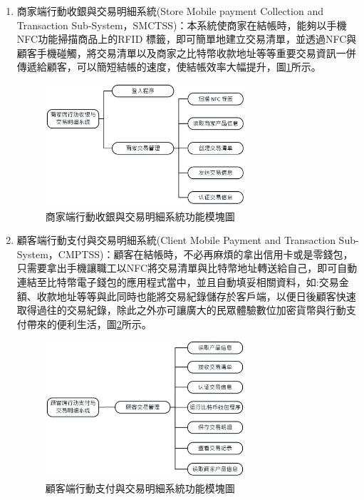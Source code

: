 \begin{enumerate}
		\item 商家端行動收銀與交易明細系統(Store Mobile payment Collection and Transaction Sub-System，SMCTSS)：本系統使商家在結帳時，能夠以手機NFC功能掃描商品上的RFID 標籤，即可簡單地建立交易清單，並透過NFC與顧客手機碰觸，將交易清單以及商家之比特幣收款地址等等重要交易資訊一併傳遞給顧客，可以簡短結帳的速度，使結帳效率大幅提升，圖\ref{model3}所示。
		 
			\begin{figure}[htbp]
			\centering
			\includegraphics[width = 0.7\textwidth]{model3.jpg}
			\caption{商家端行動收銀與交易明細系統功能模塊圖}\label{model3}
			\end{figure}


		\item 顧客端行動支付與交易明細系統(Client Mobile Payment and Transaction Sub-System，CMPTSS)：顧客在結帳時，不必再麻煩的拿出信用卡或是零錢包，只需要拿出手機讓職工以NFC將交易清單與比特幣地址轉送給自己，即可自動連結至比特幣電子錢包的應用程式當中，並且自動填妥相關資料，如:交易金額、收款地址等等與此同時也能將交易紀錄儲存於客戶端，以便日後顧客快速取得過往的交易紀錄，除此之外亦可讓廣大的民眾體驗數位加密貨幣與行動支付帶來的便利生活，圖\ref{model2}所示。
			\begin{figure}[htbp]
			\centering
			\includegraphics[width = 0.7\textwidth]{model2.jpg}
			\caption{顧客端行動支付與交易明細系統功能模塊圖}\label{model2}
			\end{figure}
		
	\end{enumerate}


